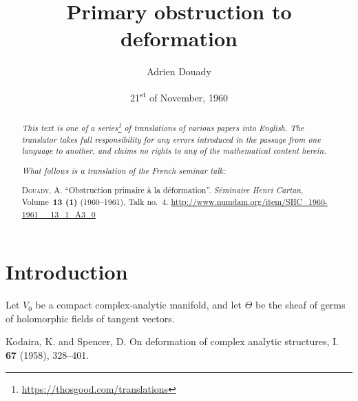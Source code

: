 \documentclass{article}
\title{Primary obstruction to deformation}
\author{Adrien Douady}
\date{21\textsuperscript{st} of November, 1960}
\theoremstyle{plain}
\theoremstyle{definition}
\newcommand{\oldpage}[1]{\marginpar{\footnotesize$\Big\vert$ \textit{p.~#1}}}
\begin{document}
\maketitle
\thispagestyle{fancy}

\renewcommand{\abstractname}{Translator's note.}

\begin{abstract}
  \renewcommand*{\thefootnote}{\fnsymbol{footnote}}
  \emph{This text is one of a series\footnote{\url{https://thosgood.com/translations}} of translations of various papers into English.}
  \emph{The translator takes full responsibility for any errors introduced in the passage from one language to another, and claims no rights to any of the mathematical content herein.}

  \medskip
  
  \emph{What follows is a translation of the French seminar talk:}

  \medskip\noindent
  \textsc{Douady, A.}
  ``Obstruction primaire \`{a} la d\'{e}formation''.
  \emph{S\'{e}minaire Henri Cartan}, Volume~\textbf{13 (1)} (1960--1961), Talk no.~4.
  {\url{http://www.numdam.org/item/SHC_1960-1961__13_1_A3_0}}
\end{abstract}

\setcounter{footnote}{0}

\tableofcontents
\bigskip



\section*{Introduction}
\label{introduction}

\oldpage{4-01}
Let $V_0$ be a compact complex-analytic manifold, and let $\Theta$ be the sheaf of germs of holomorphic fields of tangent vectors.





\nocite{*}

\begin{thebibliography}{5}

  {\sc Kodaira, K. and Spencer, D.}
  \newblock On deformation of complex analytic structures, I.
   \textbf{67} (1958), 328--401.

\end{thebibliography}
\end{document}
